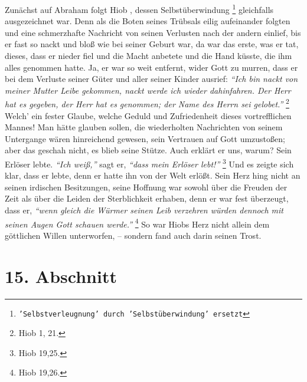 Zunächst auf Abraham folgt Hiob , dessen Selbstüberwindung
\footnote{\texttt{'Selbstverleugnung' durch 'Selbstüberwindung' ersetzt}} gleichfalls
ausgezeichnet war. Denn als die Boten seines Trübsals eilig aufeinander
folgten und eine schmerzhafte Nachricht von seinen Verlusten nach der andern
einlief, bis er fast so nackt und bloß wie bei seiner Geburt war, da war das
erste, was er tat, dieses, dass er nieder fiel und die Macht anbetete und die
Hand küsste, die ihm alles genommen hatte. Ja, er war so weit entfernt, wider
Gott zu murren, dass er bei dem Verluste seiner Güter und aller seiner Kinder
ausrief:
\textit{"`Ich bin nackt von meiner Mutter Leibe gekommen, nackt werde ich
wieder dahinfahren. Der Herr hat es gegeben, der Herr hat es genommen; der Name
des Herrn sei gelobet."'}
\footnote{Hiob 1, 21.}
Welch' ein fester Glaube, welche
Geduld und Zufriedenheit dieses vortrefflichen Mannes! Man hätte glauben sollen,
die wiederholten Nachrichten von seinem Untergange wären hinreichend gewesen,
sein Vertrauen auf Gott umzustoßen; aber das geschah nicht, es blieb seine
Stütze. Auch erklärt er uns, warum? Sein Erlöser lebte.
\textit{"`Ich weiß,"'} sagt er,
\textit{"`dass mein Erlöser lebt!"'}
\footnote{Hiob 19,25.}
Und es zeigte sich
klar, dass er lebte, denn er hatte ihn von der Welt erlößt. Sein Herz hing
nicht an seinen irdischen Besitzungen, seine Hoffnung war sowohl über die
Freuden der Zeit als über die Leiden der Sterblichkeit erhaben, denn er war fest
überzeugt, dass er,
\textit{"`wenn gleich die Würmer seinen Leib verzehren würden
dennoch mit seinen Augen Gott schauen werde."'}
\footnote{Hiob 19,26.}
So war Hiobs
Herz nicht allein dem göttlichen Willen unterworfen, – sondern fand auch darin
seinen Trost. 

\section{15. Abschnitt} \label{kap4_ab15}

